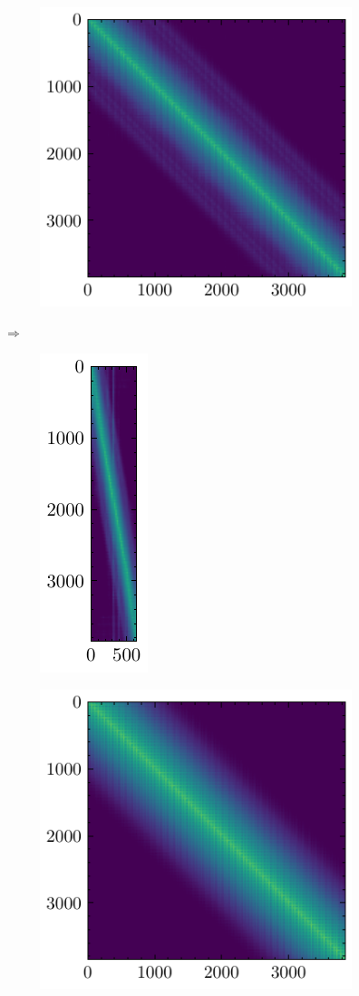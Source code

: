 \begin{figure}[ht]
\centering
\begin{subfigure}{0.5\linewidth}
\centering
\includegraphics[scale=1.0]{Pics/densityO}
\end{subfigure}
$\Longrightarrow$
\begin{subfigure}{0.4\linewidth}
\centering
\includegraphics[scale=1.0]{Pics/choleskyO}
\end{subfigure}%
\hfill
\centering
\begin{subfigure}{0.5\linewidth}
\centering
\includegraphics[scale=1.0]{Pics/densityV}

\end{subfigure}
\end{figure}
